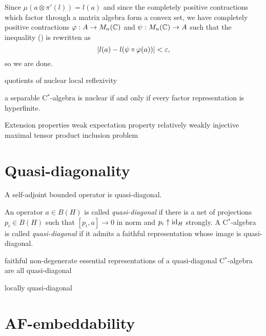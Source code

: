 \documentclass{../../large}
\begin{document}
\begin{pf}
Since $\mu(a\otimes\pi'(l))=l(a)$ and since the completely positive contractions which factor through a matrix algebra form a convex set, we have completely positive contractions $\varphi:A\to M_n(\mathbb{C})$ and $\psi:M_n(\mathbb{C})\to A$ such that the inequality (\dagger) is rewritten as
\[|l(a)-l(\psi\circ\varphi(a))|<\varepsilon,\]
so we are done.
\end{pf}





quotients of nuclear
local reflexivity


a separable C$^*$-algebra is nuclear if and only if every factor representation is hyperfinite.

Extension properties
weak expectation property
relatively weakly injective
maximal tensor product inclusion problem




\section{Quasi-diagonality}

\begin{prb}
A self-adjoint bounded operator is quasi-diagonal.
\end{prb}

\begin{prb}
\end{prb}

\begin{prb}
\end{prb}


\begin{prb}
An operator $a\in B(H)$ is called \emph{quasi-diagonal} if there is a net of projections $p_i\in B(H)$ such that $[p_i,a]\to0$ in norm and $p_i\uparrow\operatorname{id}_H$ strongly.
A C$^*$-algebra is called \emph{quasi-diagonal} if it admits a faithful representation whose image is quasi-diagonal.
\end{prb}

faithful non-degenerate essential representations of a quasi-diagonal C$^*$-algebra are all quasi-diagonal

locally quasi-diagonal

\section{AF-embeddability}
\end{document}
